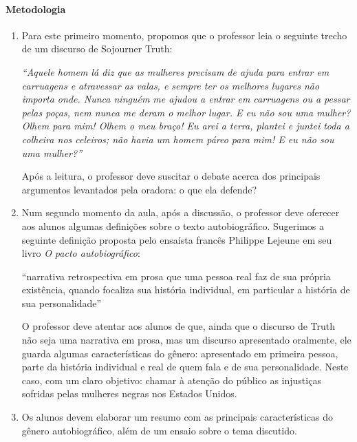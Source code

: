 \documentclass[11pt]{extarticle}
\begin{document}
\paragraph{Metodologia}

   \begin{enumerate}
    \item 
    Para este primeiro momento, propomos que o professor leia o seguinte trecho
    de um discurso de Sojourner Truth:

    \textit{``Aquele homem lá diz que as mulheres precisam de ajuda para entrar em carruagens
    e atravessar as valas, e sempre ter os melhores lugares não importa onde. Nunca ninguém
    me ajudou a entrar em carruagens ou a pessar pelas poças, nem nunca me deram o melhor
    lugar. E eu não sou uma mulher? Olhem para mim! Olhem o meu braço! Eu arei a terra, 
    plantei e juntei toda a colheira nos celeiros; não havia um homem páreo para mim! 
    E eu não sou uma mulher?''}

    Após a leitura, o professor deve suscitar o debate acerca dos principais argumentos 
    levantados pela oradora: o que ela defende? 

    \item
    Num segundo momento da aula, após a discussão, o professor deve oferecer aos alunos algumas 
    definições sobre o texto autobiográfico. Sugerimos a seguinte definição
    proposta pelo ensaísta francês Philippe Lejeune em seu livro \emph{O pacto autobiográfico}:

    ``narrativa retrospectiva em prosa que uma pessoa real faz de sua própria existência, 
    quando focaliza sua história individual, em particular a história de sua personalidade'' 

    O professor deve atentar aos alunos de que, ainda que o discurso de Truth não seja uma 
    narrativa em prosa, mas um discurso apresentado oralmente, ele guarda algumas características
    do gênero: apresentado em primeira pessoa, parte da história individual e real de quem fala
    e de sua personalidade. Neste caso, com um claro objetivo: chamar à atenção do público
    as injustiças sofridas pelas mulheres negras nos Estados Unidos.

    \item
    Os alunos devem elaborar um resumo com as principais características do gênero autobiográfico,
    além de um ensaio sobre o tema discutido.

   \end{enumerate}
\end{document}
